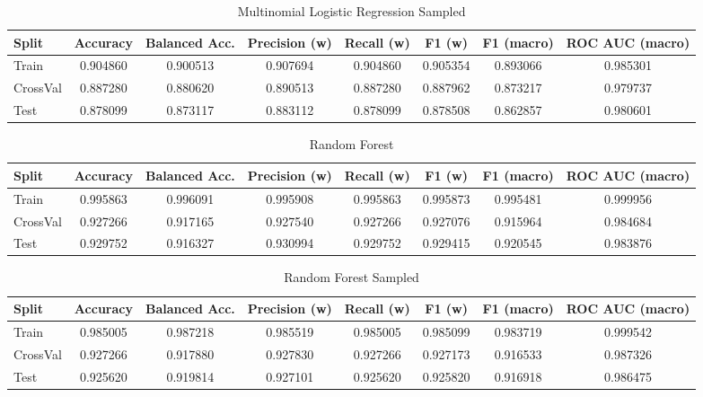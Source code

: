 \begin{table}[H]
	\centering
	\caption{Multinomial Logistic Regression Sampled}
	\begin{adjustbox}{max width=\textwidth}
		\begin{tabular}{lccccccc}
			\toprule
			Split & Accuracy & Balanced Acc. & Precision (w) & Recall (w) & F1 (w) & F1 (macro) & ROC AUC (macro) \\
			\midrule
			Train & 0.904860 & 0.900513 & 0.907694 & 0.904860 & 0.905354 & 0.893066 & 0.985301 \\
			CrossVal & 0.887280 & 0.880620 & 0.890513 & 0.887280 & 0.887962 & 0.873217 & 0.979737 \\
			Test & 0.878099 & 0.873117 & 0.883112 & 0.878099 & 0.878508 & 0.862857 & 0.980601 \\
			\bottomrule
		\end{tabular}
	\end{adjustbox}
\end{table}

\begin{table}[H]
	\centering
	\caption{Random Forest}
	\begin{adjustbox}{max width=\textwidth}
		\begin{tabular}{lccccccc}
			\toprule
			Split & Accuracy & Balanced Acc. & Precision (w) & Recall (w) & F1 (w) & F1 (macro) & ROC AUC (macro) \\
			\midrule
			Train & 0.995863 & 0.996091 & 0.995908 & 0.995863 & 0.995873 & 0.995481 & 0.999956 \\
			CrossVal & 0.927266 & 0.917165 & 0.927540 & 0.927266 & 0.927076 & 0.915964 & 0.984684 \\
			Test & 0.929752 & 0.916327 & 0.930994 & 0.929752 & 0.929415 & 0.920545 & 0.983876 \\
			\bottomrule
		\end{tabular}
	\end{adjustbox}
\end{table}

\begin{table}[H]
	\centering
	\caption{Random Forest Sampled}
	\begin{adjustbox}{max width=\textwidth}
		\begin{tabular}{lccccccc}
			\toprule
			Split & Accuracy & Balanced Acc. & Precision (w) & Recall (w) & F1 (w) & F1 (macro) & ROC AUC (macro) \\
			\midrule
			Train & 0.985005 & 0.987218 & 0.985519 & 0.985005 & 0.985099 & 0.983719 & 0.999542 \\
			CrossVal & 0.927266 & 0.917880 & 0.927830 & 0.927266 & 0.927173 & 0.916533 & 0.987326 \\
			Test & 0.925620 & 0.919814 & 0.927101 & 0.925620 & 0.925820 & 0.916918 & 0.986475 \\
			\bottomrule
		\end{tabular}
	\end{adjustbox}
\end{table}

